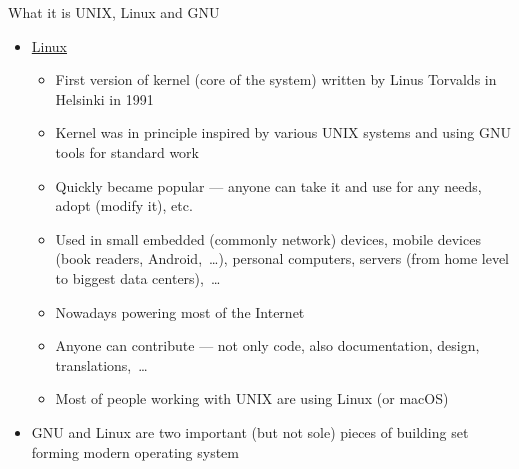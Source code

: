 \documentclass[compress, ucs, xelatex, 11pt, xcolor=svgnames, aspectratio=169,
	hyperref={
		bookmarks=true,
		unicode=true,
		colorlinks=true,
		pdftitle={Linux, command line and MetaCentrum},
		plainpages=false,
		pdfauthor={Vojtech Zeisek},
		pdfsubject={Course about use of Linux command line, writing shell scripts and using MetaCentrum of CESNET},
		pdfcreator={XeLaTeX},
		pdfkeywords={Linux, GNU, BASH, shell, command line, MetaCentrum},
		linkcolor=DarkRed, %
		anchorcolor=DarkBlue, %
		citecolor=Indigo, %
		filecolor=NavyBlue, %
		menucolor=DarkMagenta, %
		urlcolor=DarkBlue, %
		pdftex},
	url={hyphens, lowtilde} %
	]{beamer}
\begin{document}
\begin{frame}[allowframebreaks]{What it is UNIX, Linux and GNU}
\begin{itemize}
\begin{itemize}
			\item Since 1984 Richard Stallman (founder of \href{https://www.fsf.org/}{Free Software Foundation}) tried to make new kernel (Hurd --- not finished yet\ldots)
			\item Generally set of basic system tools --- working with many kernels (Linux, BSD*, macOS,~\ldots), also present in many commercial paid UNIX systems
			\item Source code is free and open --- anyone can study it (Security!), report bugs, contribute, modify, share it,~\ldots
			\item GNU General Public License (GPL) --- free spirit of open-source --- license, idea, how to share software
			\item Inspired open public software development --- crucial for our usage of Linux \& al.
		\end{itemize}
		\item \href{https://en.wikipedia.org/wiki/Linux}{Linux}
		\begin{itemize}
			\item First version of kernel (core of the system) written by Linus Torvalds in Helsinki in 1991
			\item Kernel was in principle inspired by various UNIX systems and using GNU tools for standard work
			\item Quickly became popular --- anyone can take it and use for any needs, adopt (modify it), etc.
			\item Used in small embedded (commonly network) devices, mobile devices (book readers, Android,~\ldots), personal computers, servers (from home level to biggest data centers),~\ldots
			\item Nowadays powering most of the Internet
			\item Anyone can contribute --- not only code, also documentation, design, translations,~\ldots
			\item Most of people working with UNIX are using Linux (or macOS)
		\end{itemize}
		\item GNU and Linux are two important (but not sole) pieces of building set forming modern operating system
	\end{itemize}
\end{frame}
\end{document}
